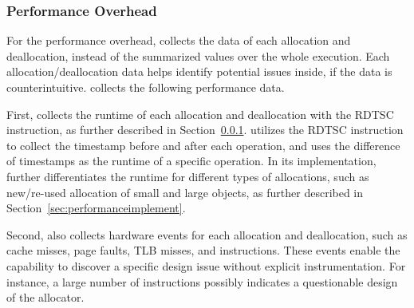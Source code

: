 \subsubsection{Performance Overhead}

For the performance overhead, \MP{} collects the  data of each allocation and deallocation, instead of the summarized values over the whole execution. Each allocation/deallocation data helps identify potential issues inside, if the data is counterintuitive. \MP{} collects the following performance data. 

First, \MP{} collects the runtime of each allocation and deallocation with the RDTSC instruction, as further described in Section~\ref{}.  \MP{} utilizes the RDTSC instruction to collect the timestamp before and after each operation, and uses the difference of timestamps as the runtime of a specific operation. In its implementation, \MP{} further differentiates the runtime for different types of allocations, such as new/re-used allocation of small and large objects, as further described in Section~\ref{sec:performanceimplement}. 

Second, \MP{} also collects hardware events for each allocation and deallocation, such as cache misses, page faults, TLB misses, and instructions. These events enable the capability to discover a specific design issue without explicit instrumentation. For instance, a large number of instructions possibly indicates a questionable design of the allocator. 




